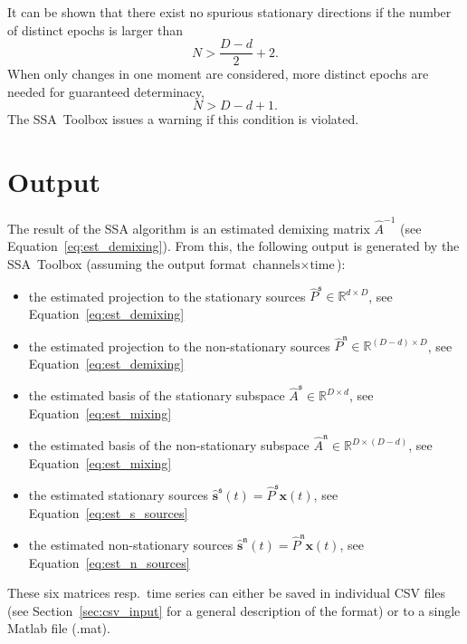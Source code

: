 \documentclass{article}
\newcommand{\R}{\ensuremath{\mathds{R}}}
\newcommand{\1}{\ensuremath{\mathds{1}}}
\newcommand{\s}{\ensuremath{\mathfrak{s}}}
\newcommand{\n}{\ensuremath{\mathfrak{n}}}
\newcommand{\0}{\ensuremath{0}}
\begin{document}
It can be shown \cite{PRL:SSA:2009} that there exist no spurious stationary directions 
if the number of distinct epochs is larger than 
\begin{equation*}
	N > \frac{D-d}{2} + 2.
\end{equation*}
When only changes in one moment are considered, more
distinct epochs are needed for guaranteed determinacy,
\begin{equation*}
	N > D-d + 1 .
\end{equation*}
The SSA~Toolbox issues a warning if this condition is violated.

\section{Output}

The result of the SSA algorithm is an estimated demixing matrix $\hat{A}^{-1}$
(see Equation~\ref{eq:est_demixing}). From this, the following output
is generated by the SSA~Toolbox (assuming the output format $\text{channels} \times \text{time}$):
\begin{itemize}
	\item the estimated projection to the stationary sources $\hat{P}^\s \in \R^{d \times D}$, 
				see Equation~\ref{eq:est_demixing}
						
	\item the estimated projection to the non-stationary sources $\hat{P}^\n \in \R^{ (D-d) \times D}$, 
		see Equation~\ref{eq:est_demixing}

	\item the estimated basis of the stationary subspace $\hat{A}^\s \in \R^{D \times d}$, 
		see Equation~\ref{eq:est_mixing}
	
	\item the estimated basis of the non-stationary subspace $\hat{A}^\n \in \R^{D \times (D-d)}$,
		see Equation~\ref{eq:est_mixing}

	\item the estimated stationary sources $\hat{\mathbf s}^\s(t) = \hat{P}^\s {\mathbf x}(t)$, 
		see Equation~\ref{eq:est_s_sources}
	
	\item the estimated non-stationary sources $\hat{\mathbf s}^\n(t) = \hat{P}^\n {\mathbf x}(t) $,
		see Equation~\ref{eq:est_n_sources}
	
\end{itemize}
These six matrices resp.~time series can either be saved in individual CSV files 
(see Section~\ref{sec:csv_input} for a general description of the format) or to a single
Matlab file (.mat). 
\end{document}
